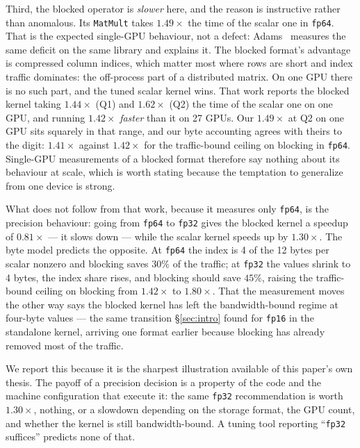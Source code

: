 \documentclass[11pt]{article}
\begin{document}
Third, the blocked operator is \emph{slower} here, and the reason is instructive
rather than anomalous. Its \texttt{MatMult} takes $1.49\times$ the time of the
scalar one in \texttt{fp64}. That is the expected single-GPU behaviour, not a
defect: Adams~\cite{baijkokkos} measures the same deficit on the same library and
explains it. The blocked format's advantage is compressed column indices, which
matter most where rows are short and index traffic dominates: the off-process
part of a distributed matrix. On one GPU there is no such part, and the tuned
scalar kernel wins. That work reports the blocked
kernel
taking $1.44\times$ (Q1) and $1.62\times$ (Q2) the time of the scalar one on one
GPU, and running $1.42\times$ \emph{faster} than it on 27 GPUs. Our $1.49\times$
at Q2 on one GPU sits squarely in that range, and our byte accounting agrees
with theirs to the digit: $1.41\times$ against $1.42\times$ for the
traffic-bound ceiling on blocking in \texttt{fp64}. Single-GPU measurements of a
blocked format therefore say nothing about its behaviour at scale, which is
worth stating because the temptation to
generalize from one device is strong.

What does not follow from that work, because it measures only \texttt{fp64}, is
the precision behaviour: going from \texttt{fp64} to \texttt{fp32} gives the
blocked kernel a speedup of $0.81\times$ --- it slows down --- while the scalar
kernel speeds up by $1.30\times$. The byte model predicts the opposite. At
\texttt{fp64} the index is 4 of the 12 bytes per scalar nonzero and blocking
saves $30\%$ of the traffic; at \texttt{fp32} the values shrink to 4 bytes, the
index share rises, and blocking should save $45\%$, raising the traffic-bound
ceiling on blocking from $1.42\times$ to $1.80\times$. That the measurement
moves the other way says the blocked kernel
has left the bandwidth-bound regime at four-byte values --- the same transition
\S\ref{sec:intro} found for \texttt{fp16} in the standalone kernel, arriving one
format earlier because blocking has already removed most of the traffic.

We report this because it is the sharpest illustration available of this paper's
own thesis. The payoff of a precision decision is a property of the code and the
machine configuration that execute it: the same \texttt{fp32} recommendation is
worth $1.30\times$, nothing, or a slowdown depending on the storage format, the
GPU count, and whether the kernel is still bandwidth-bound. A tuning tool
reporting ``\texttt{fp32} suffices'' predicts none of that.
\end{document}
